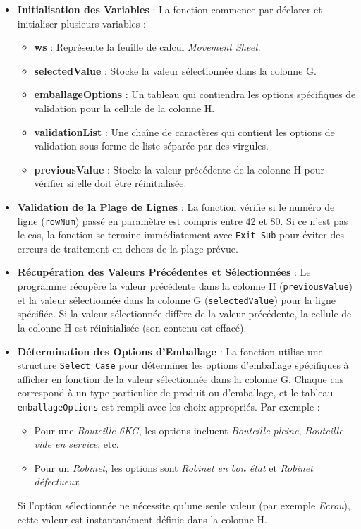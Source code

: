 \documentclass[a4paper, oneside, 12pt, final]{extreport}
\begin{document}
\begin{itemize}
    \item \textbf{Initialisation des Variables} : La fonction commence par déclarer et initialiser plusieurs variables :
        \begin{itemize}
            \item \textbf{ws} : Représente la feuille de calcul \textit{Movement Sheet}.
            \item \textbf{selectedValue} : Stocke la valeur sélectionnée dans la colonne G.
            \item \textbf{emballageOptions} : Un tableau qui contiendra les options spécifiques de validation pour la cellule de la colonne H.
            \item \textbf{validationList} : Une chaîne de caractères qui contient les options de validation sous forme de liste séparée par des virgules.
            \item \textbf{previousValue} : Stocke la valeur précédente de la colonne H pour vérifier si elle doit être réinitialisée.
        \end{itemize}

    \item \textbf{Validation de la Plage de Lignes} : La fonction vérifie si le numéro de ligne (\texttt{rowNum}) passé en paramètre est compris entre 42 et 80. Si ce n'est pas le cas, la fonction se termine immédiatement avec \texttt{Exit Sub} pour éviter des erreurs de traitement en dehors de la plage prévue.

    \item \textbf{Récupération des Valeurs Précédentes et Sélectionnées} : Le programme récupère la valeur précédente dans la colonne H (\texttt{previousValue}) et la valeur sélectionnée dans la colonne G (\texttt{selectedValue}) pour la ligne spécifiée. Si la valeur sélectionnée diffère de la valeur précédente, la cellule de la colonne H est réinitialisée (son contenu est effacé).

    \item \textbf{Détermination des Options d'Emballage} : La fonction utilise une structure \texttt{Select Case} pour déterminer les options d'emballage spécifiques à afficher en fonction de la valeur sélectionnée dans la colonne G. Chaque cas correspond à un type particulier de produit ou d'emballage, et le tableau \texttt{emballageOptions} est rempli avec les choix appropriés. Par exemple :
        \begin{itemize}
            \item Pour une \textit{Bouteille 6KG}, les options incluent \textit{Bouteille pleine}, \textit{Bouteille vide en service}, etc.
            \item Pour un \textit{Robinet}, les options sont \textit{Robinet en bon état} et \textit{Robinet défectueux}.
        \end{itemize}
        Si l'option sélectionnée ne nécessite qu'une seule valeur (par exemple \textit{Ecrou}), cette valeur est instantanément définie dans la colonne H.


\end{itemize}
\end{document}
